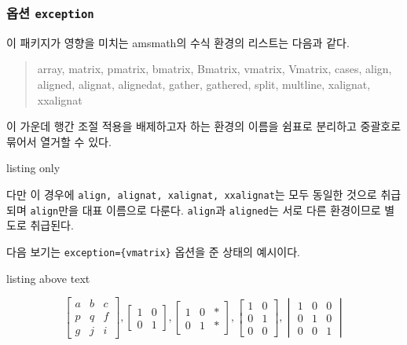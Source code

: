 \documentclass[a4paper,amsmath]{oblivoir}
\newcommand\pkg[1]{\textsf{#1}}
\begin{document}
\subsubsection{옵션 \texttt{exception}}

이 패키지가 영향을 미치는 \pkg{amsmath}의 수식 환경의 리스트는 다음과 같다.

\begin{quote}
\begin{ttfamily}
    array, matrix, pmatrix, bmatrix, Bmatrix, vmatrix, Vmatrix, 
    cases, align, aligned, alignat, alignedat, gather, gathered,
    split, multline, xalignat, xxalignat
\end{ttfamily}
\end{quote} 

이 가운데 행간 조절 적용을 배제하고자 하는 환경의 이름을 쉼표로 분리하고 중괄호로 묶어서 열거할 수 있다.

\begin{tcblisting}{listing only}
    \usepackage[exception={cases,vmatrix}]{ob-mathleading}
\end{tcblisting}

다만 이 경우에 \texttt{align, alignat, xalignat, xxalignat}는 모두 동일한 
것으로 취급되며 \texttt{align}만을 대표 이름으로 다룬다. \texttt{align}과 \texttt{aligned}는
서로 다른 환경이므로 별도로 취급된다.

다음 보기는 \verb|exception={vmatrix}| 옵션을 준 상태의 예시이다.

\begin{tcblisting}{listing above text}
\begin{obMathLeading}
\[
    \begin{bmatrix} a & b & c \\ p & q & f \\ g & j & i \end{bmatrix}, 
    \begin{bmatrix} 1 & 0 \\ 0 & 1\end{bmatrix},
    \begin{bmatrix} 1 & 0 & \ast\! \\ 0 & 1 & \ast\! \end{bmatrix},
    \begin{bmatrix} 1 & 0 \\ 0 & 1 \\ 0 & 0 \end{bmatrix},
    \begin{vmatrix} 1 & 0 & 0 \\ 0 & 1 & 0 \\ 0 & 0 & 1 \end{vmatrix}
\]
\end{obMathLeading}
\end{tcblisting}
\end{document}
